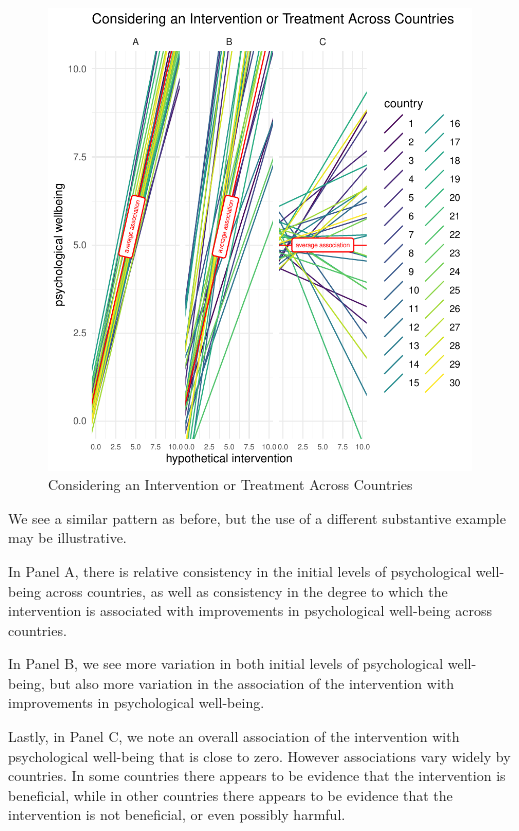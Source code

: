 \documentclass[
  letterpaper,
  DIV=11,
  numbers=noendperiod]{scrreprt}
\begin{document}
\begin{figure}

{\centering \includegraphics{conceptual-framework_files/figure-pdf/fig-variation2-1.pdf}

}

\caption{\label{fig-variation2}Considering an Intervention or Treatment
Across Countries}

\end{figure}

We see a similar pattern as before, but the use of a different
substantive example may be illustrative.

In Panel A, there is relative consistency in the initial levels of
psychological well-being across countries, as well as consistency in the
degree to which the intervention is associated with improvements in
psychological well-being across countries.

In Panel B, we see more variation in both initial levels of
psychological well-being, but also more variation in the association of
the intervention with improvements in psychological well-being.

Lastly, in Panel C, we note an overall association of the intervention
with psychological well-being that is close to zero. However
associations vary widely by countries. In some countries there appears
to be evidence that the intervention is beneficial, while in other
countries there appears to be evidence that the intervention is not
beneficial, or even possibly harmful.
\end{document}
